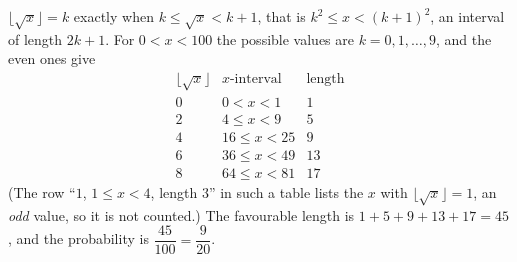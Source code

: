 $\lfloor\sqrt{x}\rfloor=k$ exactly when $k\le\sqrt{x}<k+1$, that is $k^2\le x<(k+1)^2$, an interval of length $2k+1$. For $0<x<100$ the possible values are $k=0,1,\dots,9$, and the even ones give
\[
\begin{array}{ccc}
\lfloor\sqrt{x}\rfloor & x\text{-interval} & \text{length}\\
0&0<x<1&1\\
2&4\le x<9&5\\
4&16\le x<25&9\\
6&36\le x<49&13\\
8&64\le x<81&17
\end{array}
\]
(The row ``$1$, $1\le x<4$, length $3$'' in such a table lists the $x$ with $\lfloor\sqrt{x}\rfloor=1$, an \emph{odd} value, so it is not counted.) The favourable length is $1+5+9+13+17=45$, and the probability is $\dfrac{45}{100}=\boxed{\dfrac{9}{20}}$.
